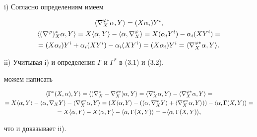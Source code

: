 \begin{pf} i) Согласно определениям имеем 


\begin{gather*} 


\la\nabla^{\varphi*}_X\alpha,Y\ra= 


(X\alpha_i)Y^i, \\ 


\la(\nabla^\varphi)^*_X\alpha,Y\ra= 


X\la\alpha,Y\ra-\la\alpha,\nabla^\varphi_X\ra= 


X(\alpha_i Y^i)-\alpha_i(XY^i)= \\


=(X\alpha_i)Y^i+\alpha_i(XY^i)-\alpha_i(XY^i)= 


(X\alpha_i)Y^i=\la\nabla^{\varphi*}_X\alpha,Y\ra. 


\end{gather*} 


 


 


ii) Учитывая i) и определения $\Gamma$ и $\Gamma^*$ в (3.1) и (3.2),


можем написать 


\begin{multline*} 


\la\Gamma^*(X,\alpha),Y\ra=\la(\nabla^*_X- 


\nabla^{\varphi*}_X)\alpha,Y\ra=\la\nabla^*_X\alpha,Y\ra- 


\la\nabla^{\varphi*}_X\alpha,Y\ra = \\ 


=X\la\alpha,Y\ra-\la\alpha,\nabla_X Y\ra- 


\la\nabla^{\varphi*}_X\alpha,Y\ra= 


(X\la\alpha,Y\ra-(\la\alpha,\nabla^\varphi_X Y\ra+ 


\la\nabla^{\varphi*}_X\alpha,Y\ra))- 


\la\alpha,\Gamma(X,Y)\ra = \\ 


=X\la\alpha,Y\ra-X\la\alpha,Y\ra- 


\la\alpha,\Gamma(X,Y)\ra=-\la\alpha,\Gamma(X,Y)\ra, 


\end{multline*} 


что и доказывает ii). 


\end{pf} 


 


